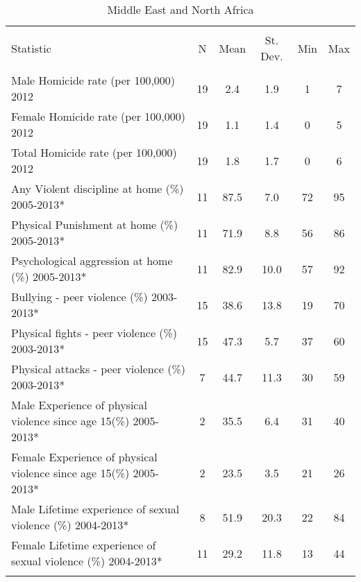
\begin{table}[!htbp] \centering 
  \caption{Middle East and North Africa} 
  \label{} 
\begin{tabular}{@{\extracolsep{5pt}}lccccc} 
\\[-1.8ex]\hline 
\hline \\[-1.8ex] 
Statistic & \multicolumn{1}{c}{N} & \multicolumn{1}{c}{Mean} & \multicolumn{1}{c}{St. Dev.} & \multicolumn{1}{c}{Min} & \multicolumn{1}{c}{Max} \\ 
\hline \\[-1.8ex] 
Male Homicide rate (per 100,000) 2012 & 19 & 2.4 & 1.9 & 1 & 7 \\ 
Female Homicide rate (per 100,000)  2012 & 19 & 1.1 & 1.4 & 0 & 5 \\ 
Total Homicide rate (per 100,000)  2012 & 19 & 1.8 & 1.7 & 0 & 6 \\ 
Any Violent discipline at home (\%) 2005-2013* & 11 & 87.5 & 7.0 & 72 & 95 \\ 
Physical Punishment at home (\%) 2005-2013* & 11 & 71.9 & 8.8 & 56 & 86 \\ 
Psychological aggression at home (\%) 2005-2013* & 11 & 82.9 & 10.0 & 57 & 92 \\ 
Bullying - peer violence (\%) 2003-2013* & 15 & 38.6 & 13.8 & 19 & 70 \\ 
Physical fights - peer violence (\%) 2003-2013* & 15 & 47.3 & 5.7 & 37 & 60 \\ 
Physical attacks - peer violence (\%) 2003-2013* & 7 & 44.7 & 11.3 & 30 & 59 \\ 
Male Experience of physical violence since age 15(\%) 2005-2013* & 2 & 35.5 & 6.4 & 31 & 40 \\ 
Female Experience of physical violence since age 15(\%) 2005-2013* & 2 & 23.5 & 3.5 & 21 & 26 \\ 
Male Lifetime experience of sexual violence (\%) 2004-2013* & 8 & 51.9 & 20.3 & 22 & 84 \\ 
Female Lifetime experience of sexual violence (\%) 2004-2013* & 11 & 29.2 & 11.8 & 13 & 44 \\ 
\hline \\[-1.8ex] 
\end{tabular} 
\end{table} 
